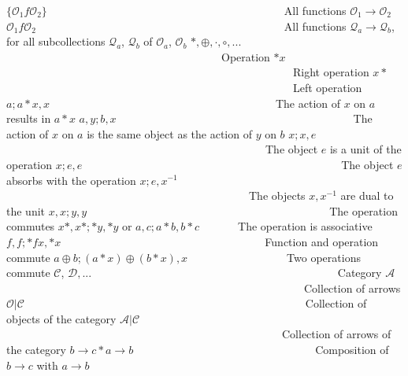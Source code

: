 \documentclass [12pt]{book}
\begin{document}
$\{\mathcal O_1f\mathcal O_2\}$~~~~~~~~~~~~~~~~~~~~~~~~~~~~~~~~~~~~~~~~~~~All functions $\mathcal O_1\rightarrow\mathcal O_2$\newline
$\mathcal O_1f\mathcal O_2$~~~~~~~~~~~~~~~~~~~~~~~~~~~~~~~~~~~~~~~~~~~~~All functions $\mathcal Q_a\rightarrow\mathcal Q_b$, for all subcollections $\mathcal Q_a$, $\mathcal Q_b$ of $\mathcal O_a$, $\mathcal O_b$\newline
$*,\oplus,\cdot,\circ,...$~~~~~~~~~~~~~~~~~~~~~~~~~~~~~~~~~~~~~~~Operation\newline
$*x$~~~~~~~~~~~~~~~~~~~~~~~~~~~~~~~~~~~~~~~~~~~~~~~~~~~~Right operation\newline
$x*$~~~~~~~~~~~~~~~~~~~~~~~~~~~~~~~~~~~~~~~~~~~~~~~~~~~~Left operation\newline
$a;a*x,x$~~~~~~~~~~~~~~~~~~~~~~~~~~~~~~~~~~~~~~~~~The action of $x$ on $a$ results in $a*x$\newline
$a,y;b,x$~~~~~~~~~~~~~~~~~~~~~~~~~~~~~~~~~~~~~~~~~~~The action of $x$ on $a$ is the same object as the action of $y$ on $b$\newline
$x;x,e$~~~~~~~~~~~~~~~~~~~~~~~~~~~~~~~~~~~~~~~~~~~~~~~The object $e$ is a unit of the operation\newline
$x;e,e$~~~~~~~~~~~~~~~~~~~~~~~~~~~~~~~~~~~~~~~~~~~~~~~The object $e$ absorbs with the operation\newline
$x;e,x^{-1}$~~~~~~~~~~~~~~~~~~~~~~~~~~~~~~~~~~~~~~~~~~~~The objects $x,x^{-1}$ are dual to the unit\newline
$x,x;y,y$~~~~~~~~~~~~~~~~~~~~~~~~~~~~~~~~~~~~~~~~~~~~The operation commutes\newline
$x*,x*;*y,*y$ or $a,c;a*b,b*c$~~~~~~~The operation is associative\newline
$f,f;*fx,*x$~~~~~~~~~~~~~~~~~~~~~~~~~~~~~~~~~~~~~Function and operation commute\newline
$a\oplus b;(a*x)\oplus(b*x),x$~~~~~~~~~~~~~~~~~~Two operations commute\newline
$\mathcal C$, $\mathcal D,...$
~~~~~~~~~~~~~~~~~~~~~~~~~~~~~~~~~~~~~~~~~~~~Category\newline
$\mathcal A$~~~~~~~~~~~~~~~~~~~~~~~~~~~~~~~~~~~~~~~~~~~~~~~~~~~~~~Collection of arrows\newline
$\mathcal{O|C}$~~~~~~~~~~~~~~~~~~~~~~~~~~~~~~~~~~~~~~~~~~~~~~~~~~~Collection of objects of the category\newline
$\mathcal{A|C}$~~~~~~~~~~~~~~~~~~~~~~~~~~~~~~~~~~~~~~~~~~~~~~~~~~Collection of arrows of the category\newline
$b\rightarrow c*a\rightarrow b$~~~~~~~~~~~~~~~~~~~~~~~~~~~~~~~~~Composition of $b\rightarrow c$ with $a\rightarrow b$\newline
\end{document}
